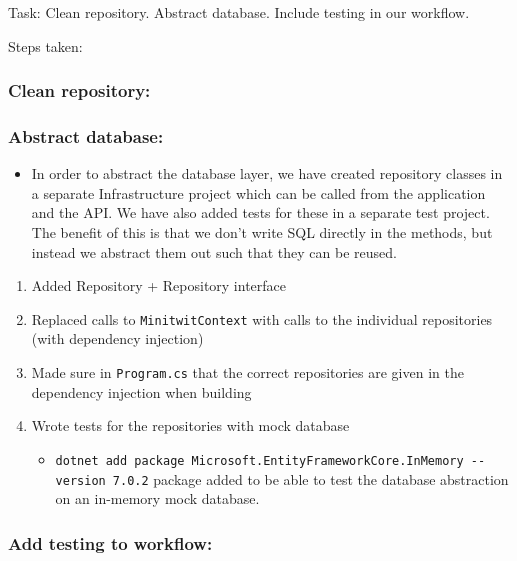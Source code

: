Task: Clean repository. Abstract database. Include testing in our
workflow.

Steps taken:

\subsubsection{Clean repository:}
\label{log:clean-repository}

\subsubsection{Abstract database:}
\label{log:abstract-database}

\begin{itemize}
    \item In order to abstract the database layer, we have created repository classes in a separate Infrastructure project which can be called from the application and the API. We have also added tests for these in a separate test project. The benefit of this is that we don't write SQL directly in the methods, but instead we abstract them out such that they can be reused.
\end{itemize}

\begin{enumerate}
    \item Added Repository + Repository interface
    \item Replaced calls to \texttt{MinitwitContext} with calls to the individual repositories (with dependency injection)
    \item Made sure in \texttt{Program.cs} that the correct repositories are given in the dependency injection when building
    \item Wrote tests for the repositories with mock database

    \begin{itemize}
        \item \texttt{dotnet\ add\ package\ Microsoft.EntityFrameworkCore.InMemory\ -\/-version\ 7.0.2} package added to be able to test the database abstraction on an in-memory mock database.
    \end{itemize}
\end{enumerate}

\subsubsection{Add testing to workflow:}
\label{log:add-testing-to-workflow}

